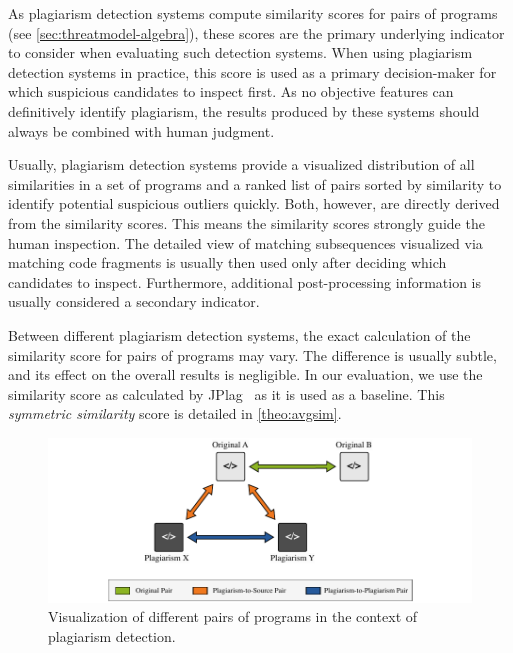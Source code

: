 As plagiarism detection systems compute similarity scores for pairs of programs (see \autoref{sec:threatmodel-algebra}), these scores are the primary underlying indicator to consider when evaluating such detection systems.
When using plagiarism detection systems in practice, this score is used as a primary decision-maker for which suspicious candidates to inspect first.
As no objective features can definitively identify plagiarism, the results produced by these systems should always be combined with human judgment.

Usually, plagiarism detection systems provide a visualized distribution of all similarities in a set of programs and a ranked list of pairs sorted by similarity to identify potential suspicious outliers quickly.
Both, however, are directly derived from the similarity scores.
This means the similarity scores strongly guide the human inspection. The detailed view of matching subsequences visualized via matching code fragments is usually then used only after deciding which candidates to inspect. Furthermore, additional post-processing information is usually considered a secondary indicator.

Between different plagiarism detection systems, the exact calculation of the similarity score for pairs of programs may vary. The difference is usually subtle, and its effect on the overall results is negligible. In our evaluation, we use the similarity score as calculated by JPlag~\cite{prechelt2000} as it is used as a baseline. This \textit{symmetric similarity} score is detailed in \autoref{theo:avgsim}.


\begin{figure}[b]
    \centering
    \includegraphics[width=0.95\linewidth]{figures/methodology/Metrics-Pairs.pdf}
    \caption[Different types of Program Pairs]{Visualization of different pairs of programs in the context of plagiarism detection.}
    \label{fig:pair-types}
\end{figure}


